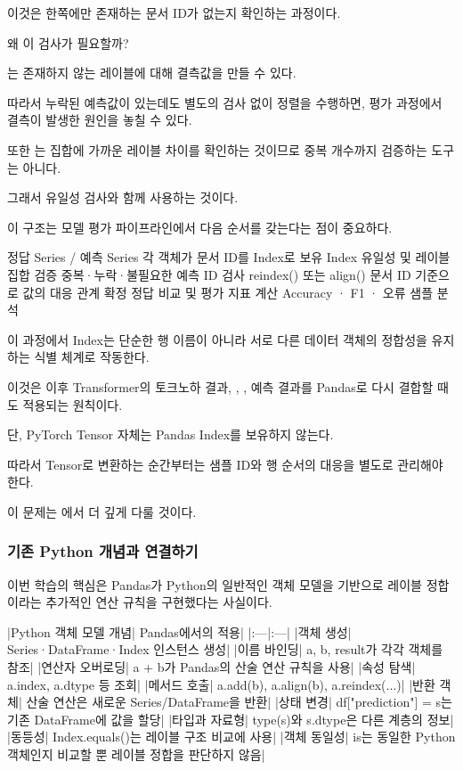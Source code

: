 이것은 한쪽에만 존재하는 문서 ID가 없는지 확인하는 과정이다.

왜 이 검사가 필요할까?

는 존재하지 않는 레이블에 대해 결측값을 만들 수 있다.

따라서 누락된 예측값이 있는데도 별도의 검사 없이 정렬을 수행하면, 평가 과정에서 결측이 발생한 원인을 놓칠 수 있다.

또한 는 집합에 가까운 레이블 차이를 확인하는 것이므로 중복 개수까지 검증하는 도구는 아니다.

그래서 유일성 검사와 함께 사용하는 것이다.

이 구조는 모델 평가 파이프라인에서 다음 순서를 갖는다는 점이 중요하다.

\begin{dhksmry}[centered]
정답 Series / 예측 Series
각 객체가 문서 ID를 Index로 보유
\da
Index 유일성 및 레이블 집합 검증
중복·누락·불필요한 예측 ID 검사
\da
reindex() 또는 align()
문서 ID 기준으로 값의 대응 관계 확정
\da
정답 비교 및 평가 지표 계산
Accuracy · F1 · 오류 샘플 분석
\end{dhksmry}

이 과정에서 Index는 단순한 행 이름이 아니라 서로 다른 데이터 객체의 정합성을 유지하는 식별 체계로 작동한다.

이것은 이후 Transformer의 토크노하 결과, , , 예측 결과를 Pandas로 다시 결합할 때도 적용되는 원칙이다.

단, PyTorch Tensor 자체는 Pandas Index를 보유하지 않는다.

따라서 Tensor로 변환하는 순간부터는 샘플 ID와 행 순서의 대응을 별도로 관리해야 한다.

이 문제는 에서 더 깊게 다룰 것이다.

\subsubsection{기존 Python 개념과 연결하기}

이번 학습의 핵심은 Pandas가 Python의 일반적인 객체 모델을 기반으로 레이블 정합이라는 추가적인 연산 규칙을 구현했다는 사실이다.

\begin{dhktable}
|Python 객체 모델 개념|	Pandas에서의 적용|
|:---|:---|
|객체 생성|	Series·DataFrame·Index 인스턴스 생성|
|이름 바인딩|	a, b, result가 각각 객체를 참조|
|연산자 오버로딩|	a + b가 Pandas의 산술 연산 규칙을 사용|
|속성 탐색|	a.index, a.dtype 등 조회|
|메서드 호출|	a.add(b), a.align(b), a.reindex(...)|
|반환 객체|	산술 연산은 새로운 Series/DataFrame을 반환|
|상태 변경|	df["prediction"] = s는 기존 DataFrame에 값을 할당|
|타입과 자료형|	type(s)와 s.dtype은 다른 계층의 정보|
|동등성|	Index.equals()는 레이블 구조 비교에 사용|
|객체 동일성|	is는 동일한 Python 객체인지 비교할 뿐 레이블 정합을 판단하지 않음|
\end{dhktable}

